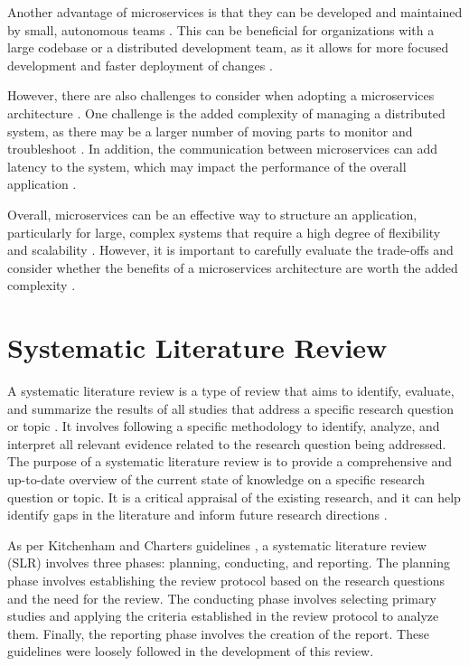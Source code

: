 \documentclass[conference]{IEEEtran}
\begin{document}
Another advantage of microservices is that they can be developed and maintained
by small, autonomous teams \cite{chen2018microservices}. This can be beneficial
for organizations with a large codebase or a distributed development team, as
it allows for more focused development and faster deployment of changes
\cite{nadareishvili2016microservice}.

However, there are also challenges to consider when adopting a microservices
architecture \cite{fowler-microservices-tradeoffs}. One challenge is the added
complexity of managing a distributed system, as there may be a larger number of
moving parts to monitor and troubleshoot \cite{newman2021building}. In
addition, the communication between microservices can add latency to the
system, which may impact the performance of the overall application
\cite{fowler-microservices-tradeoffs} \cite{pautasso2017microservices}.

Overall, microservices can be an effective way to structure an application,
particularly for large, complex systems that require a high degree of
flexibility and scalability \cite{newman2021building}. However, it is important
to carefully evaluate the trade-offs and consider whether the benefits of a
microservices architecture are worth the added complexity
\cite{fowler-microservices-tradeoffs}.

\section{Systematic Literature Review}

A systematic literature review is a type of review that aims to identify,
evaluate, and summarize the results of all studies that address a specific
research question or topic 
 . It involves
following a specific methodology to identify, analyze, and interpret all
relevant evidence related to the research question being addressed. The purpose
of a systematic literature review is to provide a comprehensive and up-to-date
overview of the current state of knowledge on a specific research question or
topic. It is a critical appraisal of the existing research, and it can help
identify gaps in the literature and inform future research directions
.

As per Kitchenham and Charters guidelines , a
systematic literature review (SLR) involves three phases: planning, conducting,
and reporting. The planning phase involves establishing the review protocol
based on the research questions and the need for the review. The conducting
phase involves selecting primary studies and applying the criteria established
in the review protocol to analyze them. Finally, the reporting phase involves
the creation of the report. These guidelines were loosely followed in the
development of this review.
\end{document}
